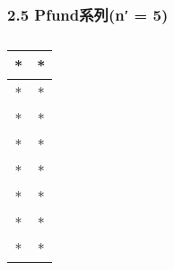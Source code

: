 \subsubsection{2.5 Pfund系列(n′ = 5)}
\begin{table}[ht]
\centering
\caption{ }\label{tab_QYZGP5}
\begin{tabular}{|c|c|}
\hline
* & * \\
\hline
* & * \\
\hline
* & * \\
\hline
* & * \\
\hline
* & * \\
\hline
* & * \\
\hline
* & * \\
\hline
* & * \\
\hline
\end{tabular}
\end{table}
